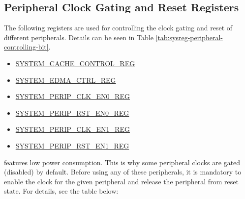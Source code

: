 \documentclass[main\_\_EN.tex]{subfiles}
\begin{document}
\subsection{Peripheral Clock Gating and Reset Registers}

The following registers are used for controlling the clock gating and reset of different peripherals. Details can be seen in Table \ref{tab:sysreg-peripheral-controlling-bit}.

\begin{itemize}
    \item \hyperref[regdesc:SYSTEMCACHECONTROLREG]{SYSTEM\_CACHE\_CONTROL\_REG}
    \item \hyperref[regdesc:SYSTEMEDMACTRLREG]{SYSTEM\_EDMA\_CTRL\_REG}
    \item \hyperref[regdesc:SYSTEMPERIPCLKEN0REG]{SYSTEM\_PERIP\_CLK\_EN0\_REG}
    \item \hyperref[regdesc:SYSTEMPERIPRSTEN0REG]{SYSTEM\_PERIP\_RST\_EN0\_REG}
    \item \hyperref[regdesc:SYSTEMPERIPCLKEN1REG]{SYSTEM\_PERIP\_CLK\_EN1\_REG}
    \item \hyperref[regdesc:SYSTEMPERIPRSTEN1REG]{SYSTEM\_PERIP\_RST\_EN1\_REG}

\end{itemize}

\chipname{} features low power consumption. This is why some peripheral clocks are gated (disabled) by default. Before using any of these peripherals, it is mandatory to enable the clock for the given peripheral and release the peripheral from reset state. For details, see the table below:
\end{document}
